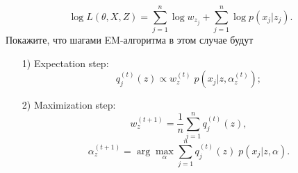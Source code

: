 \begin{problem}
\[
\log L(\theta, X, Z) = \sum \limits_{j=1}^{n} \log w_{z_j} + \sum \limits_{j=1}^{n} \log  p (x_j | z_j). 
\]
Покажите, что шагами  EM-алгоритма в этом случае будут 

\begin{enumerate}
\item[1)] Expectation step:
\[
q_{j}^{(t)}(z) \propto w_{z}^{(t)} \; p (x_j | z, \alpha_z^{(t)});
\]
\item[2)] Maximization step:
\[
w_z^{(t+1)} = \frac{1}{n}   \sum \limits_{j=1}^{n} q_{j}^{(t)}(z),
\]
\[
\alpha_z^{(t+1)} = \arg \max \limits_{\alpha}  \sum \limits_{j = 1}^n q_{j}^{(t)}(z) \; p (x_j | z, \alpha). 
\]
\end{enumerate}

\end{problem}

\begin{comment}
Приведем два важных обобщения EM-алгоритма:
\begin{enumerate}
\item PP-алгоритм (см. Васильев, Методы оптимизации – М.: Факториал Пресс, 2002): 
\[
Q(\theta) \to \max
\]
\[
\theta^{(t+1)} = \arg \max \limits_{\theta} \{ Q(\theta)  - b_t \mathcal{R} (\theta, \theta^{(t)})\},
\]
где $\mathcal{R} (\theta, \theta^{(t)}) \geq 0$ -- регуляризатор, в нашем случае равный $\mathcal{KL}(q \Vert p(Z | X, \theta)) $.

\item Variational EM: 
\[
\mathcal{F}(q, \theta)  = \mathcal{F}(q_z(z) \cdot q_\theta(\theta)) = \log p(X) - \mathcal{KL}(q_z  q_\theta \Vert p(Z, \theta | X)). 
\] 

\begin{enumerate}
\item[1)] Expectation step:
\[
q_z^{(t)}(z)  \propto \mathrm{exp} \left\{ \int \log p(X, z, \theta) q_\theta^{(t)}(\theta) d \theta \right\}
\]

В случае $p(X, Z | \theta) = h(X, Z) g(\theta) e^{\phi(\theta)^T u(X, z)}$
\[
q_z^{(t)}(z)  \propto h(X, Z) e^{\phi^T u(X, z)} , \quad \phi^{(t)} = \int  \phi(\theta) \; q_\theta^{(t)}(\theta) d \theta. 
\]
\item[2)] Maximization step:
\[
q_\theta^{(t+1)}(\theta)  \propto \mathrm{exp} \left\{ \int \log p(X, z, \theta) q_z^{(t)}(z) dz \right\}.
\]

\end{enumerate}

\end{enumerate}
\end{comment}

